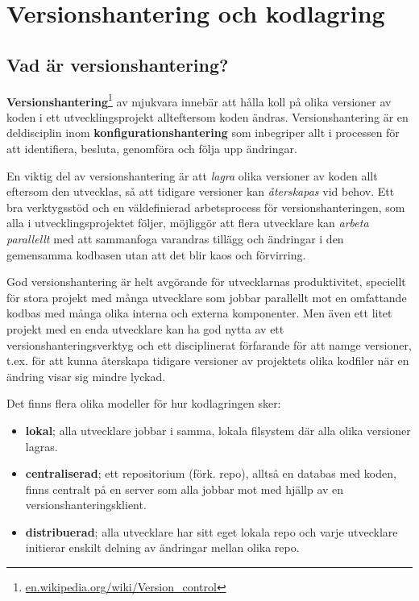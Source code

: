 

\chapter{Versionshantering och kodlagring}

\section{Vad är versionshantering?}

\textbf{Versionshantering}\footnote{\href{https://en.wikipedia.org/wiki/Version_control}{en.wikipedia.org/wiki/Version\_control}}  av mjukvara innebär att hålla koll på olika versioner av koden i ett utvecklingsprojekt allteftersom koden ändras. Versionshantering är en deldisciplin inom \textbf{konfigurationshantering}  som inbegriper allt i processen för att identifiera, besluta, genomföra och följa upp ändringar.

En viktig del av versionshantering är att \textit{lagra} olika versioner av koden allt eftersom den utvecklas, så att tidigare versioner kan \textit{återskapas} vid behov. Ett bra verktygsstöd och en väldefinierad arbetsprocess för versionshanteringen, som alla i utvecklingsprojektet följer, möjliggör att flera utvecklare kan \textit{arbeta parallellt} med att sammanfoga  varandras tillägg och ändringar i den gemensamma kodbasen utan att det blir kaos och förvirring.

God versionshantering är helt avgörande för utvecklarnas produktivitet, speciellt för stora projekt med många utvecklare som jobbar parallellt mot en omfattande kodbas med många olika interna och externa komponenter. 
Men även ett litet projekt med en enda utvecklare kan ha god nytta av ett versionshanteringsverktyg och ett disciplinerat förfarande för att namge versioner, t.ex. för att kunna återskapa tidigare versioner av projektets olika kodfiler när en ändring visar sig mindre lyckad.   

Det finns flera olika modeller för hur kodlagringen sker:
\begin{itemize}
\item \textbf{lokal}; alla utvecklare jobbar i samma, lokala filsystem där alla olika versioner lagras.
\item \textbf{centraliserad}; ett repositorium (förk. repo), alltså en databas med koden, finns centralt på en server som alla jobbar mot med hjällp av en versionshanteringsklient.
\item \textbf{distribuerad}; alla utvecklare har sitt eget lokala repo och varje utvecklare initierar enskilt delning av ändringar mellan olika repo. 
\end{itemize}


